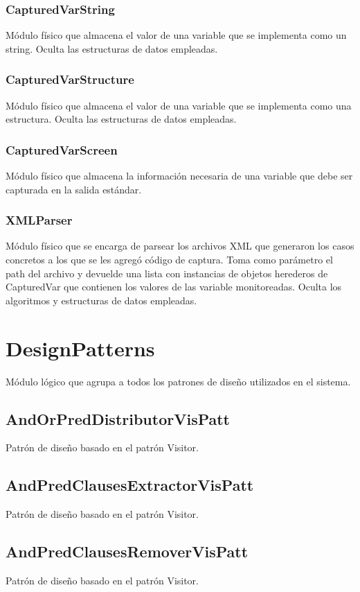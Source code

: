 \documentclass[a4paper,10pt]{report}
\begin{document}
			\subsection{CapturedVarString}
			Módulo físico que almacena el valor de una variable que se implementa como un string. Oculta las estructuras de datos empleadas.
			\subsection{CapturedVarStructure}
			Módulo físico que almacena el valor de una variable que se implementa como una estructura. Oculta las estructuras de datos empleadas.
			\subsection{CapturedVarScreen}
			Módulo físico que almacena la información necesaria de una variable que debe ser capturada en la salida estándar.
			\subsection{XMLParser}
			Módulo físico que se encarga de parsear los archivos XML que generaron los casos concretos a los que se les agregó código de captura. Toma como parámetro el path del archivo y devuelde una lista con instancias de objetos herederos de CapturedVar que contienen los valores de las variable monitoreadas.
			Oculta los algoritmos y estructuras de datos empleadas.





\chapter{DesignPatterns}
Módulo lógico que agrupa a todos los patrones de diseño utilizados en el sistema.
	\section{AndOrPredDistributorVisPatt}
	Patrón de diseño basado en el patrón Visitor.
	\section{AndPredClausesExtractorVisPatt}
	Patrón de diseño basado en el patrón Visitor.
	\section{AndPredClausesRemoverVisPatt}
	Patrón de diseño basado en el patrón Visitor.
\end{document}
